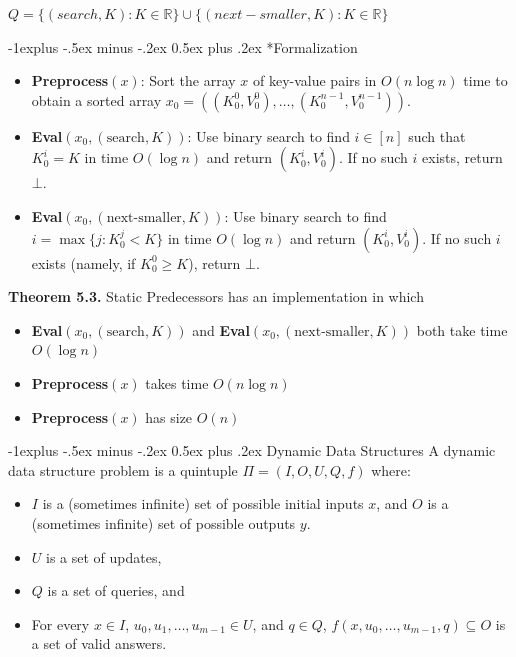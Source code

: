 \documentclass[10pt,landscape]{article}
\makeatletter
\renewcommand{\subsection}{\@startsection{subsection}{2}{0mm}%
                                {-1explus -.5ex minus -.2ex}%
                                {0.5ex plus .2ex}%
                                {\normalfont\normalsize\bfseries}}
\makeatother
\begin{document}
\begin{multicols*}{3}
$Q = \{(search, K) : K \in \mathbb{R}\} \cup \{(next-smaller, K) : K \in \mathbb{R}\}$

\subsection*{Formalization}
\begin{itemize}
\item \textbf{Preprocess}$(x)$: Sort the array $x$ of key-value pairs in $O(n \log n)$ time to obtain a sorted array $x_0 = ((K_0^0, V_0^0), \ldots, (K_0^{n-1}, V_0^{n-1}))$.

\item \textbf{Eval}$(x_0, (\text{search}, K))$: Use binary search to find $i \in [n]$ such that $K_0^i = K$ in time $O(\log n)$ and return $(K_0^i, V_0^i)$. If no such $i$ exists, return $\bot$.

\item \textbf{Eval}$(x_0, (\text{next-smaller}, K))$: Use binary search to find $i = \max\{j : K_0^j < K\}$ in time $O(\log n)$ and return $(K_0^i, V_0^i)$. If no such $i$ exists (namely, if $K_0^0 \geq K$), return $\bot$.
\end{itemize}

\textbf{Theorem 5.3.} Static Predecessors has an implementation in which
\begin{itemize}
\item \textbf{Eval}$(x_0, (\text{search}, K))$ and \textbf{Eval}$(x_0, (\text{next-smaller}, K))$ both take time $O(\log n)$
\item \textbf{Preprocess}$(x)$ takes time $O(n \log n)$
\item \textbf{Preprocess}$(x)$ has size $O(n)$
\end{itemize}

\subsection{Dynamic Data Structures}
A dynamic data structure problem is a quintuple $\Pi = (I, O, U, Q, f)$ where:
\begin{itemize}
\item $I$ is a (sometimes infinite) set of possible initial inputs $x$, and $O$ is a (sometimes infinite) set of possible outputs $y$.
\item $U$ is a set of updates,
\item $Q$ is a set of queries, and
\item For every $x \in I$, $u_0, u_1, \ldots, u_{m-1} \in U$, and $q \in Q$, $f(x, u_0, \ldots, u_{m-1}, q) \subseteq O$ is a set of valid answers.
\end{itemize}


\end{multicols*}
\end{document}
